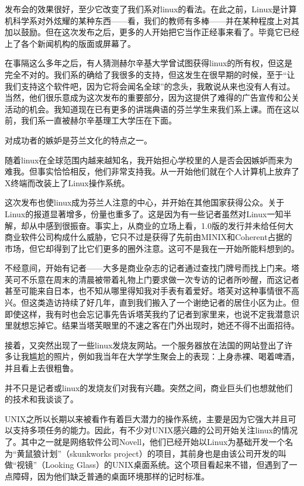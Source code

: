 发布会的效果很好，至少它改变了我们系对linux的看法。在此之前，Linux是计算机科学系对外炫耀的某种东西——看，我们的教师有多棒——并在某种程度上对其加以鼓励。但在这次发布之后，更多的人开始把它当作正经事来看了。毕竟它已经上了各个新闻机构的版面或屏幕了。

在事隔这么多年之后，有人猜测赫尔辛基大学曾试图获得linux的所有权，但这是完全不对的。我们系的确给了我很多的支持，但这发生在很早期的时候，至于“让我们支持这个软件吧，因为它将会闻名全球”的念头，我敢说从来也没有人有过。当然，他们很乐意成为这次发布的重要部分，因为这提供了难得的广告宣传和公关活动的机会。我知道现在已有更多的讲瑞典语的芬兰学生来我们系上课。而在这以前，我们系一直被赫尔辛基理工大学压在下面。

对成功者的嫉妒是芬兰文化的特点之一。

随着linux在全球范围内越来越知名，我开始担心学校里的人是否会因嫉妒而来为难我。但事实恰恰相反，他们非常支持我。从一开始他们就在个人计算机上放弃了X终端而改装上了Linux操作系统。

这次发布也使linux成为芬兰人注意的中心，并开始在其他国家获得公众。关于Linux的报道显著增多，份量也重多了。这是因为有一些记者虽然对Linux一知半解，却从中感到很振奋。事实上，从商业的立场上看，1.0版的发行并未给任何大商业软件公司构成什么威胁，它只不过是获得了先前由MINIX和Coherent占据的市场，但它却得到了比它们更多的圈外注意。这可不是我在一开始所能料想到的。

不经意间，开始有记者——大多是商业杂志的记者通过查找门牌号而找上门来。塔芙可不乐意在周末的清晨被带着礼物上门要求做一次专访的记者所吵醒，而这记者甚至可能来自日本，也不知从哪里得知我对手表有着爱好。塔芙对这种事情很不高兴。但这类造访持续了好几年，直到我们搬入了一个谢绝记者的居住小区为止。但即使这样，我有时也会忘记事先告诉塔芙我约了记者到家里来，也说不定我潜意识里就想忘掉它。结果当塔芙眼里的不速之客在门外出现时，她还不得不出面招待。

接着，又突然出现了一些linux发烧友网站。一个服务器放在法国的网站登出了许多让我尴尬的照片，例如我当年在大学学生聚会上的表现：上身赤裸、喝着啤酒，并且看上去很粗鲁。

并不只是记者或linux的发烧友们对我有兴趣。突然之间，商业巨头们也想就他们的技术和我谈谈了。

UNIX之所以长期以来被看作有着巨大潜力的操作系统，主要是因为它强大并且可以支持多项任务的能力。因此，有不少对UNIX感兴趣的公司开始关注linux的情况了。其中之一就是网络软件公司Novell，他们已经开始以Linux为基础开发一个名为“黄鼠狼计划”（skunkworks project）的项目，其前身也是由该公司开发的叫做“视镜”（Looking Glass）的UNIX桌面系统。这个项目看起来不错，但遇到了一点障碍，因为他们缺乏普通的桌面环境那样的记时标准。

